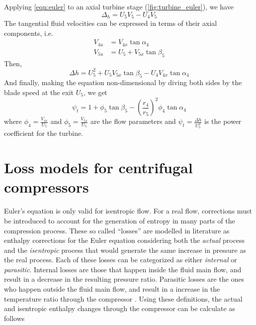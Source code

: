 \documentclass[tcc]{subfiles}
\begin{document}
Applying \cref{eqn:euler} to an axial turbine stage (\cref{fig:turbine_euler}), we have
\begin{equation}
    \Delta_h = U_5V_5-U_4V_5
\end{equation}
The tangential fluid velocities can be expressed in terms of their axial components, i.e.\
\begin{align}
    V_{4u} &= V_{4x} \tan\alpha_4 \\
    V_{5u} &= U_5 + V_{5x} \tan\beta_5
\end{align}
Then,
\begin{equation}
    \Delta h = U_5^2 + U_5 V_{5x}\tan\beta_5 - U_4 V_{4x}\tan\alpha_4
\end{equation}
And finally, making the equation non-dimensional by diving both sides by the blade speed at the exit $U_5$, we get
\begin{equation}
    \boxed{\psi_t = 1 + \phi_5\tan\beta_5-\left(\frac{r_4}{r_5}\right)^2\phi_4\tan\alpha_4}
\end{equation}
where $\phi_4 = \frac{V_{4x}}{U_5}$ and $\phi_5 = \frac{V_{5x}}{U_5}$ are the flow parameters and
$\psi_t=\frac{\Delta h}{U_5^2}$ is the power coefficient for the turbine.

\section{Loss models for centrifugal compressors}
\label{sec:compressor_losses}
Euler's equation is only valid for isentropic flow. 
For a real flow, corrections must be introduced to account for the generation of entropy in many parts of the compression process. 
These so called ``losses'' are modelled in literature as enthalpy corrections 
for the Euler equation considering both the \emph{actual} process and the \emph{isentropic} process 
that would generate the same increase in pressure as the real process.
Each of these losses can be categorized as either \emph{internal} or \emph{parasitic}.
Internal losses are those that happen inside the fluid main flow, and result in a decrease in the resulting pressure ratio.
Parasitic losses are the ones who happen outside the fluid main flow, 
and result in a increase in the temperature ratio through the compressor \cite{Galvas1973}.
Using these definitions, the actual and isentropic enthalpy changes through the compressor can be calculate as follows
\end{document}
